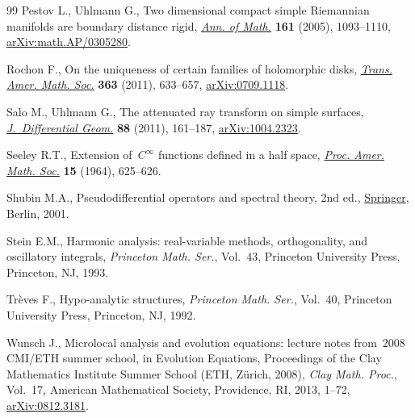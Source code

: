 \begin{thebibliography}{99}
Pestov L., Uhlmann G., Two dimensional compact simple {R}iemannian manifolds
 are boundary distance rigid,
 \href{https://doi.org/10.4007/annals.2005.161.1093}{\textit{Ann. of Math.}}
 \textbf{161} (2005), 1093--1110,
 \href{http://arxiv.org/abs/math.AP/0305280}{arXiv:math.AP/0305280}.

Rochon F., On the uniqueness of certain families of holomorphic disks,
 \href{https://doi.org/10.1090/S0002-9947-2010-05159-1}{\textit{Trans. Amer.
 Math. Soc.}} \textbf{363} (2011), 633--657,
 \href{http://arxiv.org/abs/0709.1118}{arXiv:0709.1118}.

Salo M., Uhlmann G., The attenuated ray transform on simple surfaces,
 \href{https://doi.org/10.4310/jdg/1317758872}{\textit{J.~Differential Geom.}}
 \textbf{88} (2011), 161--187,
 \href{http://arxiv.org/abs/1004.2323}{arXiv:1004.2323}.

Seeley R.T., Extension of~{$C^{\infty }$} functions defined in a half space,
 \href{https://doi.org/10.2307/2034761}{\textit{Proc. Amer. Math. Soc.}}
 \textbf{15} (1964), 625--626.

Shubin M.A., Pseudodifferential operators and spectral theory, 2nd ed.,
 \href{https://doi.org/10.1007/978-3-642-56579-3}{Springer}, Berlin, 2001.

Stein E.M., Harmonic analysis: real-variable methods, orthogonality, and
 oscillatory integrals, \textit{Princeton Math. Ser.}, Vol.~43, Princeton
 University Press, Princeton, NJ, 1993.

Tr\`eves F., Hypo-analytic structures, \textit{Princeton Math. Ser.}, Vol.~40,
 Princeton University Press, Princeton, NJ, 1992.

Wunsch J., Microlocal analysis and evolution equations: lecture notes from~2008
 {CMI}/{ETH} summer school, in Evolution {E}quations, Proceedings of the Clay
 Mathematics Institute Summer School (ETH, Z\"urich, 2008), \textit{Clay Math.
 Proc.}, Vol.~17, American Mathematical Society, Providence, RI, 2013, 1--72,
 \href{http://arxiv.org/abs/0812.3181}{arXiv:0812.3181}.

\end{thebibliography}
